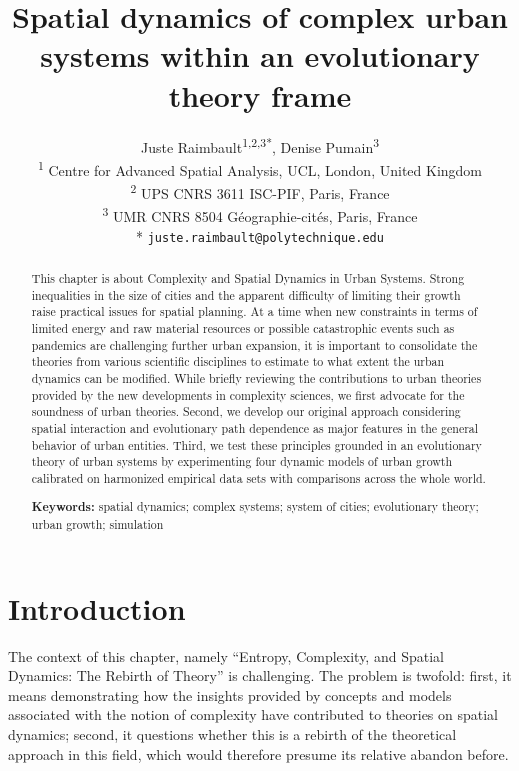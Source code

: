 \documentclass[10pt,letterpaper]{article}
\title{Spatial dynamics of complex urban systems within an evolutionary theory frame}
\date{}
\author{
Juste Raimbault\textsuperscript{1,2,3*},
Denise Pumain\textsuperscript{3}\bigskip\\
\textsuperscript{1} Centre for Advanced Spatial Analysis, UCL, London, United Kingdom
\\
\textsuperscript{2} UPS CNRS 3611 ISC-PIF, Paris, France
\\
\textsuperscript{3} UMR CNRS 8504 G{\'e}ographie-cit{\'e}s, Paris, France\bigskip\\
* \texttt{juste.raimbault@polytechnique.edu}
}
\begin{document}
\maketitle


\begin{abstract}
This chapter is about Complexity and Spatial Dynamics in Urban Systems. Strong inequalities in the size of cities and the apparent difficulty of limiting their growth raise practical issues for spatial planning. At a time when new constraints in terms of limited energy and raw material resources or possible catastrophic events such as pandemics are challenging further urban expansion, it is important to consolidate the theories from various scientific disciplines to estimate to what extent the urban dynamics can be modified. While briefly reviewing the contributions to urban theories provided by the new developments in complexity sciences, we first advocate for the soundness of urban theories. Second, we develop our original approach considering spatial interaction and evolutionary path dependence as major features in the general behavior of urban entities. Third, we test these principles grounded in an evolutionary theory of urban systems by experimenting four dynamic models of urban growth calibrated on harmonized empirical data sets with comparisons across the whole world.\medskip

	\textbf{Keywords:} spatial dynamics; complex systems; system of cities; evolutionary theory; urban growth; simulation
\end{abstract}


\justify



\section{Introduction}


The context of this chapter, namely ``Entropy, Complexity, and Spatial Dynamics: The Rebirth of Theory'' is challenging. The problem is twofold: first, it means demonstrating how the insights provided by concepts and models associated with the notion of complexity have contributed to theories on spatial dynamics; second, it questions whether this is a rebirth of the theoretical approach in this field, which would therefore presume its relative abandon before.
\end{document}

